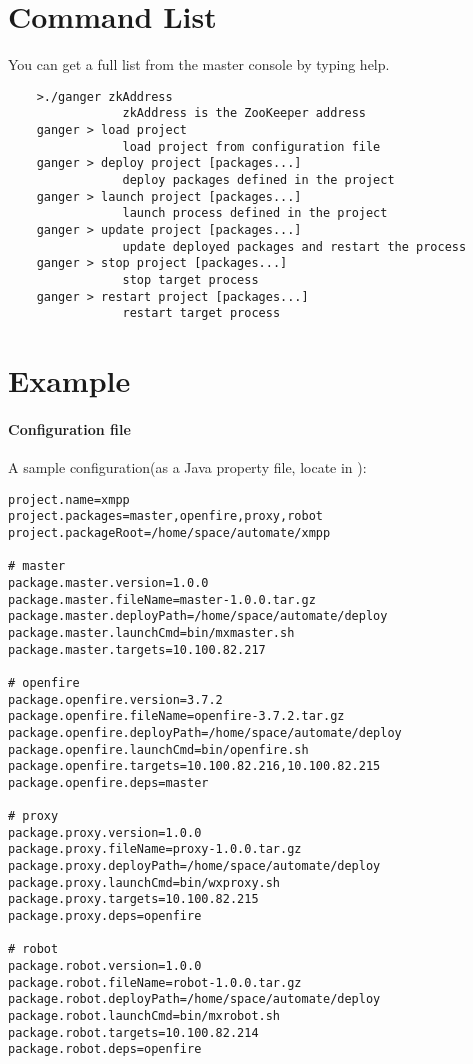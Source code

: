 \documentclass[]{article}
\newcommand{\file}{\begingroup \urlstyle{tt}\Url}
\newcommand{\program}[1]{\textsf{#1}}
\begin{document}
\section{Command List}

You can get a full list from the master console by typing \program{help}.

\begin{Verbatim}
    >./ganger zkAddress
                zkAddress is the ZooKeeper address
    ganger > load project
                load project from configuration file
    ganger > deploy project [packages...]
                deploy packages defined in the project
    ganger > launch project [packages...]
                launch process defined in the project
    ganger > update project [packages...]
                update deployed packages and restart the process
    ganger > stop project [packages...]
                stop target process
    ganger > restart project [packages...]
                restart target process
\end{Verbatim}

\section{Example}
\label{sec:example}

\paragraph{Configuration file}

A sample configuration(as a \program{Java} property file, locate in \file{sample/xmpp.properties}): 

\begin{Verbatim}
project.name=xmpp
project.packages=master,openfire,proxy,robot
project.packageRoot=/home/space/automate/xmpp

# master
package.master.version=1.0.0
package.master.fileName=master-1.0.0.tar.gz
package.master.deployPath=/home/space/automate/deploy
package.master.launchCmd=bin/mxmaster.sh
package.master.targets=10.100.82.217

# openfire
package.openfire.version=3.7.2
package.openfire.fileName=openfire-3.7.2.tar.gz
package.openfire.deployPath=/home/space/automate/deploy
package.openfire.launchCmd=bin/openfire.sh
package.openfire.targets=10.100.82.216,10.100.82.215
package.openfire.deps=master

# proxy
package.proxy.version=1.0.0
package.proxy.fileName=proxy-1.0.0.tar.gz
package.proxy.deployPath=/home/space/automate/deploy
package.proxy.launchCmd=bin/wxproxy.sh
package.proxy.targets=10.100.82.215
package.proxy.deps=openfire

# robot
package.robot.version=1.0.0
package.robot.fileName=robot-1.0.0.tar.gz
package.robot.deployPath=/home/space/automate/deploy
package.robot.launchCmd=bin/mxrobot.sh
package.robot.targets=10.100.82.214
package.robot.deps=openfire
\end{Verbatim}
\end{document}
